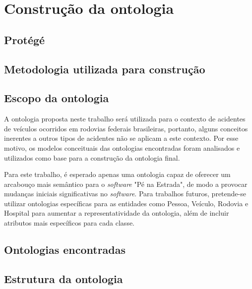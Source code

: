 \chapter{Construção da ontologia}

  \section{Protégé}

    

  \section{Metodologia utilizada para construção}
    
    
    
  \section{Escopo da ontologia}
      
      A ontologia proposta neste trabalho será utilizada para o contexto de acidentes de veículos ocorridos em rodovias
      federais brasileiras, portanto, alguns conceitos inerentes a outros tipos de acidentes não se aplicam a este 
      contexto. Por esse motivo, os modelos conceituais das ontologias encontradas foram analisados e utilizados como base 
      para a construção da ontologia final.
      
      Para este trabalho, é esperado apenas uma ontologia capaz de oferecer um arcabouço mais semântico para o \textit{software} 
      "Pé na Estrada", de modo a provocar mudanças iniciais significativas no \textit{software}.
      Para trabalhos futuros, pretende-se utilizar ontologias específicas para as entidades como Pessoa, Veículo, Rodovia e
      Hospital para aumentar a representatividade da ontologia, 
      além de incluir atributos mais específicos para cada classe.
  
  \vfill
  \pagebreak
  \section{Ontologias encontradas}
   
      
      
  \vfill
  \pagebreak
  \section{Estrutura da ontologia}

